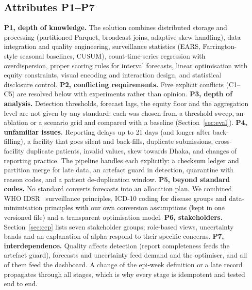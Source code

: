 \documentclass[conference]{IEEEtran}
\begin{document}
\subsection{Attributes P1--P7}
\textbf{P1, depth of knowledge.} The solution combines distributed storage and processing (partitioned Parquet, broadcast joins, adaptive skew handling), data integration and quality engineering, surveillance statistics (EARS, Farrington-style seasonal baselines, CUSUM), count-time-series regression with overdispersion, proper scoring rules for interval forecasts, linear optimisation with equity constraints, visual encoding and interaction design, and statistical disclosure control.
\textbf{P2, conflicting requirements.} Five explicit conflicts (C1--C5) are resolved below with experiments rather than opinion.
\textbf{P3, depth of analysis.} Detection thresholds, forecast lags, the equity floor and the aggregation level are not given by any standard; each was chosen from a threshold sweep, an ablation or a scenario grid and compared with a baseline (Section~\ref{sec:eval}).
\textbf{P4, unfamiliar issues.} Reporting delays up to 21 days (and longer after back-filling), a facility that goes silent and back-fills, duplicate submissions, cross-facility duplicate patients, invalid values, skew towards Dhaka, and changes of reporting practice. The pipeline handles each explicitly: a checksum ledger and partition merge for late data, an artefact guard in detection, quarantine with reason codes, and a patient de-duplication window.
\textbf{P5, beyond standard codes.} No standard converts forecasts into an allocation plan. We combined WHO IDSR~\cite{idsr} surveillance principles, ICD-10 coding for disease groups and data-minimisation principles with our own conversion assumptions (kept in one versioned file) and a transparent optimisation model.
\textbf{P6, stakeholders.} Section~\ref{sec:cep} lists seven stakeholder groups; role-based views, uncertainty bands and an explanation of alpha respond to their specific concerns.
\textbf{P7, interdependence.} Quality affects detection (report completeness feeds the artefact guard), forecasts and uncertainty feed demand and the optimiser, and all of them feed the dashboard. A change of the epi-week definition or a late record propagates through all stages, which is why every stage is idempotent and tested end to end.
\end{document}
